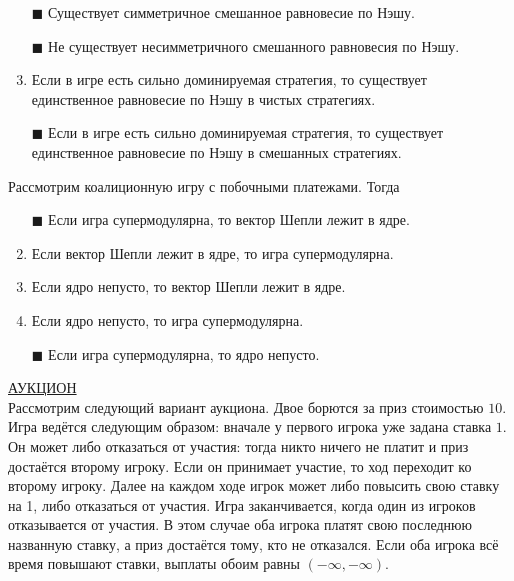 \begin{enumerate}[label=$\square$]
	
	\item[$\blacksquare$] Существует симметричное смешанное равновесие по Нэшу.
	\item[$\blacksquare$] Не существует несимметричного смешанного равновесия по Нэшу.	
	\item Если в игре есть сильно доминируемая стратегия, то существует единственное равновесие по Нэшу в чистых стратегиях.
	\item[$\blacksquare$] Если в игре есть сильно доминируемая стратегия, то существует единственное равновесие по Нэшу в смешанных стратегиях.
\end{enumerate}

\task
Рассмотрим коалиционную игру с побочными платежами. Тогда

\begin{enumerate}[label=$\square$]	%
	\item[$\blacksquare$] Если игра супермодулярна, то вектор Шепли лежит в ядре.
	\item Если вектор Шепли лежит в ядре, то игра супермодулярна.
	\item Если ядро непусто, то вектор Шепли лежит в ядре.
	\item Если ядро непусто, то игра супермодулярна.
	\item[$\blacksquare$] Если игра супермодулярна, то ядро непусто.
\end{enumerate}

\task
\underline{АУКЦИОН} \\

Рассмотрим следующий вариант аукциона. Двое борются за приз стоимостью $10$. Игра ведётся следующим образом: вначале у первого игрока уже задана ставка $1$. Он может либо отказаться от участия: тогда никто ничего не платит и приз достаётся второму игроку. Если он принимает участие, то ход переходит ко второму игроку. Далее на каждом ходе игрок может либо повысить свою ставку на 1, либо отказаться от участия. Игра заканчивается, когда один из игроков отказывается от участия. В этом случае оба игрока платят свою последнюю названную ставку, а приз достаётся тому, кто не отказался. Если оба игрока всё время повышают ставки, выплаты обоим равны $(-\infty,-\infty)$.

